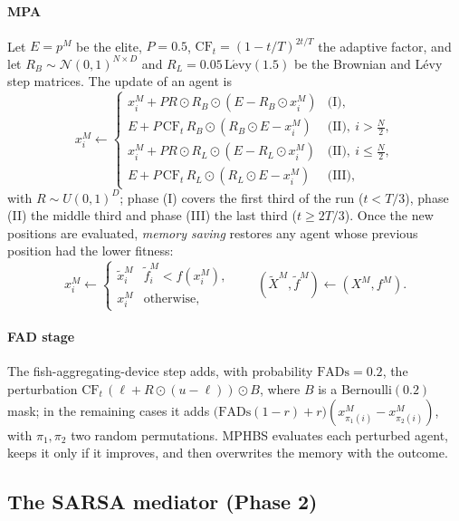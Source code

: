 \documentclass[11pt]{article}
\theoremstyle{definition}
\theoremstyle{remark}
\begin{document}
\paragraph{MPA} Let $E=p^M$ be the elite, $P=0.5$, $\mathrm{CF}_t=(1-t/T)^{2t/T}$ the adaptive factor, and let
$R_B\sim\mathcal N(0,1)^{N\times D}$ and $R_L = 0.05\,\mathrm{L\acute evy}(1.5)$ be the Brownian and L\'evy step
matrices. The update of an agent is
\begin{equation}
x^M_i \leftarrow \begin{cases}
x^M_i + P R\odot R_B\odot(E - R_B\odot x^M_i) & \text{(I)},\\
E + P\,\mathrm{CF}_t\,R_B\odot(R_B\odot E - x^M_i) & \text{(II)},\ i>\tfrac N2,\\
x^M_i + P R\odot R_L\odot(E - R_L\odot x^M_i) & \text{(II)},\ i\le\tfrac N2,\\
E + P\,\mathrm{CF}_t\,R_L\odot(R_L\odot E - x^M_i) & \text{(III)},
\end{cases}
\label{eq:mpa}
\end{equation}
with $R\sim U(0,1)^D$; phase (I) covers the first third of the run ($t<T/3$), phase (II) the middle third and phase
(III) the last third ($t\ge 2T/3$). Once the new positions are evaluated, \emph{memory saving} restores any agent whose
previous position had the lower fitness:
\begin{equation}
x^M_i \leftarrow \begin{cases}\tilde x^M_i & \tilde f^M_i < f(x^M_i),\\ x^M_i & \text{otherwise},\end{cases}
\qquad (\tilde X^M,\tilde f^M)\leftarrow (X^M, f^M).
\label{eq:memory}
\end{equation}

\paragraph{FAD stage} The fish-aggregating-device step adds, with probability $\mathrm{FADs}=0.2$, the perturbation
$\mathrm{CF}_t\,(\ell + R\odot(u-\ell))\odot B$, where $B$ is a Bernoulli$(0.2)$ mask; in the remaining cases it adds
$\bigl(\mathrm{FADs}(1-r)+r\bigr)(x^M_{\pi_1(i)}-x^M_{\pi_2(i)})$, with $\pi_1,\pi_2$ two random permutations. MPHBS
evaluates each perturbed agent, keeps it only if it improves, and then overwrites the memory with the outcome.

\subsection{The SARSA mediator (Phase 2)}
\end{document}
